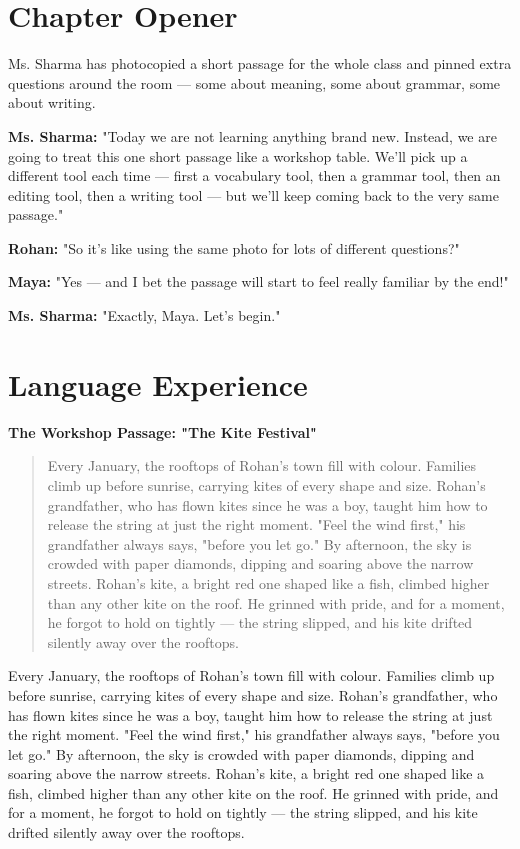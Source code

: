 \section{Chapter Opener}
Ms. Sharma has photocopied a short passage for the whole class and pinned extra questions around the room — some about meaning, some about grammar, some about writing.

\textbf{Ms. Sharma:} "Today we are not learning anything brand new. Instead, we are going to treat this one short passage like a workshop table. We'll pick up a different tool each time — first a vocabulary tool, then a grammar tool, then an editing tool, then a writing tool — but we'll keep coming back to the very same passage."

\textbf{Rohan:} "So it's like using the same photo for lots of different questions?"

\textbf{Maya:} "Yes — and I bet the passage will start to feel really familiar by the end!"

\textbf{Ms. Sharma:} "Exactly, Maya. Let's begin."

\section{Language Experience}
\textbf{The Workshop Passage: "The Kite Festival"}

\begin{quote}
Every January, the rooftops of Rohan's town fill with colour. Families climb up before sunrise, carrying kites of every shape and size. Rohan's grandfather, who has flown kites since he was a boy, taught him how to release the string at just the right moment. "Feel the wind first," his grandfather always says, "before you let go." By afternoon, the sky is crowded with paper diamonds, dipping and soaring above the narrow streets. Rohan's kite, a bright red one shaped like a fish, climbed higher than any other kite on the roof. He grinned with pride, and for a moment, he forgot to hold on tightly — the string slipped, and his kite drifted silently away over the rooftops.
\end{quote}
\begin{tcolorbox}[colback=gray!5, colframe=gray!50, sharp corners, boxsep=0pt, left=5pt, right=5pt, top=5pt, bottom=5pt, breakable]
Every January, the rooftops of Rohan's town fill with colour. Families climb up before sunrise, carrying kites of every shape and size. Rohan's grandfather, who has flown kites since he was a boy, taught him how to release the string at just the right moment. "Feel the wind first," his grandfather always says, "before you let go." By afternoon, the sky is crowded with paper diamonds, dipping and soaring above the narrow streets. Rohan's kite, a bright red one shaped like a fish, climbed higher than any other kite on the roof. He grinned with pride, and for a moment, he forgot to hold on tightly --- the string slipped, and his kite drifted silently away over the rooftops.
\end{tcolorbox}

